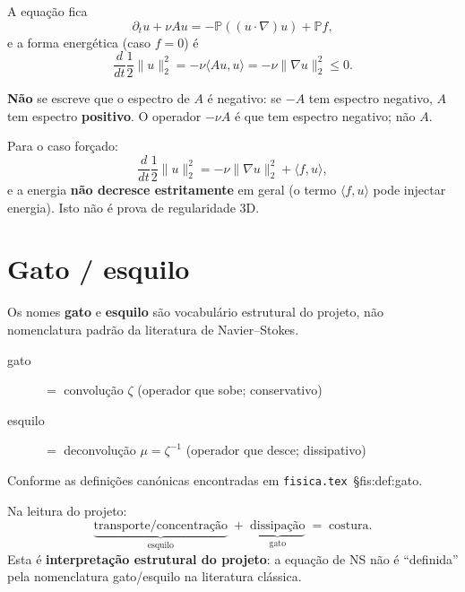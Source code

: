 \documentclass[11pt,a4paper]{article}
\newcommand\code[1]{\texttt{\small #1}}
\begin{document}
A equação fica
\begin{equation}\label{eq:NS-stokes}
\partial_t u + \nu A u = -\mathbb P((u\cdot\nabla)u) + \mathbb P f,
\end{equation}
e a forma energética (caso $f=0$) é
\begin{equation}\label{eq:energia-padrao}
\frac{d}{dt}\frac12\|u\|_2^2 = -\nu\langle Au,u\rangle
= -\nu\|\nabla u\|_2^2 \le 0.
\end{equation}

\textbf{Não} se escreve que o espectro de $A$ é negativo:
se $-A$ tem espectro negativo, $A$ tem espectro \textbf{positivo}.
O operador $-\nu A$ é que tem espectro negativo; não $A$.

Para o caso forçado:
\begin{equation}\label{eq:energia-forcada}
\frac{d}{dt}\frac12\|u\|_2^2
=
-\nu\|\nabla u\|_2^2 + \langle f,u\rangle,
\end{equation}
e a energia \textbf{não decresce estritamente} em geral
(o termo $\langle f,u\rangle$ pode injectar energia).
Isto não é prova de regularidade 3D.

\section{Gato / esquilo}\label{sec:gato-esquilo}

Os nomes \textbf{gato} e \textbf{esquilo} são vocabulário
estrutural do projeto, não nomenclatura padrão da literatura
de Navier--Stokes.
\begin{description}
\item[gato] $= $ convolução $\zeta$ (operador que sobe; conservativo)
\item[esquilo] $= $ deconvolução $\mu=\zeta^{-1}$ (operador que desce; dissipativo)
\end{description}
Conforme as definições canónicas encontradas em
\code{fisica.tex}~\S f{is:def:gato}.

Na leitura do projeto:
\begin{equation}\label{eq:costura-leitura}
\underbrace{\text{transporte/concentração}}_{\text{esquilo}}
\;+\;
\underbrace{\text{dissipação}}_{\text{gato}}
\;=\;
\text{costura}.
\end{equation}
Esta é \textbf{interpretação estrutural do projeto}:
a equação de NS não é ``definida'' pela nomenclatura
gato/esquilo na literatura clássica.
\end{document}
